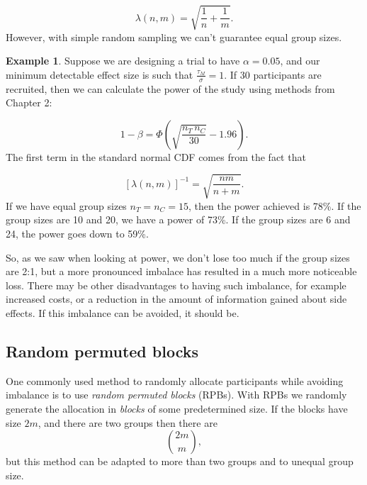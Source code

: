 \documentclass[
  openany]{book}
\theoremstyle{definition}
\theoremstyle{definition}
\newtheorem{example}{Example}[chapter]
\theoremstyle{definition}
\theoremstyle{definition}
\theoremstyle{remark}
\begin{document}
\[\lambda\left(n,m\right) = \sqrt{\frac{1}{n}+\frac{1}{m}}.\]
However, with simple random sampling we can't guarantee equal group sizes.

\begin{example}
Suppose we are designing a trial to have \(\alpha=0.05\), and our minimum detectable effect size is such that \(\frac{\tau_M}{\sigma}=1\). If 30 participants are recruited, then we can calculate the power of the study using methods from Chapter 2:

\[1-\beta = \Phi\left(\sqrt{\frac{n_T\,n_C}{30}} - 1.96\right). \]
The first term in the standard normal CDF comes from the fact that

\[\left[\lambda\left(n,m\right)\right]^{-1} = \sqrt{\frac{nm}{n+m}} .\]
If we have equal group sizes \(n_T=n_C=15\), then the power achieved is 78\%.
If the group sizes are 10 and 20, we have a power of 73\%.
If the group sizes are 6 and 24, the power goes down to 59\%.

So, as we saw when looking at power, we don't lose too much if the group sizes are 2:1, but a more pronounced imbalace has resulted in a much more noticeable loss. There may be other disadvantages to having such imbalance, for example increased costs, or a reduction in the amount of information gained about side effects. If this imbalance can be avoided, it should be.
\end{example}

\subsection{Random permuted blocks}\label{random-permuted-blocks}

One commonly used method to randomly allocate participants while avoiding imbalance is to use \emph{random permuted blocks} (RPBs). With RPBs we randomly generate the allocation in \emph{blocks} of some predetermined size. If the blocks have size \(2m\), and there are two groups then there are \[\binom{2m}{m},\] but this method can be adapted to more than two groups and to unequal group size.
\end{document}
